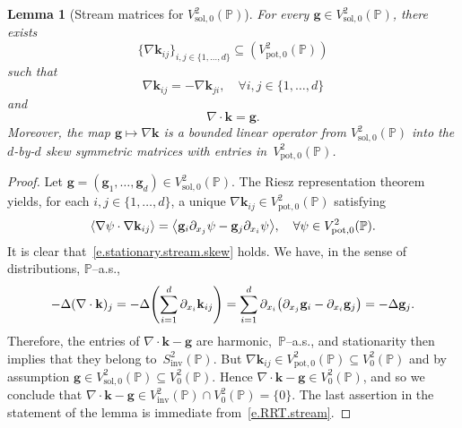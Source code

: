 \documentclass[11pt]{article} %
\numberwithin{equation}{section}
\newtheorem{lemma}[theorem]{Lemma}
\theoremstyle{definition}
\let\originalleft\left
\let\originalright\right
\renewcommand{\left}{\mathopen{}\mathclose\bgroup\originalleft}
\renewcommand{\right}{\aftergroup\egroup\originalright}
\newcommand{\g}{\mathbf{g}}
\newcommand{\pot}{\mathrm{pot}}
\newcommand{\sol}{\mathrm{sol}}
\newcommand{\inv}{\mathrm{inv}}
\renewcommand{\P}{\mathbb{P}}
\begin{document}
\begin{lemma}[Stream matrices for $V^2_{\sol,0}(\P)$]
\label{l.stationary.stream}
For every $\g\in V^2_{\sol,0}(\P)$, there exists
$$\{ \nabla \mathbf{k}_{ij} \}_{i,j\in\{1,\ldots,d\}} \subseteq (V^2_{\pot,0}(\P))$$
such that
\begin{equation}
\label{e.stationary.stream.skew}
\nabla \mathbf{k}_{ij} = -\nabla \mathbf{k}_{ji}, \quad \forall i,j\in\{1,\ldots,d\}
\end{equation}
and 
\begin{equation}
\label{e.divkg}
\nabla \cdot \mathbf{k} = \g. 
\end{equation}
Moreover, the map $\g \mapsto \nabla \mathbf{k}$ is a bounded linear operator from $V^2_{\sol,0}(\P)$ into the $d$-by-$d$ skew symmetric matrices with entries in~$V^2_{\pot,0}(\P)$.  
\end{lemma}
\begin{proof}
Let $\g = (\g_1,\ldots,\g_d) \in V^2_{\sol,0}(\P)$. The Riesz representation theorem yields, for each $i,j\in\{1,\ldots,d\}$, a unique $\nabla \mathbf{k}_{ij}\in V^2_{\pot,0}(\P)$ satisfying
\begin{equation}
\label{e.RRT.stream}
\left\langle \nabla \psi\cdot \nabla \mathbf{k}_{ij}  \right\rangle 
=
\left\langle 
\g_{i} \partial_{x_j} \psi - \g_j \partial_{x_i} \psi
\right\rangle, \quad \forall \psi\in V^2_{\pot,0}(\P).
\end{equation}
It is clear that~\eqref{e.stationary.stream.skew} holds. We have, in the sense of distributions, $\P$--a.s.,  
\begin{equation*}
-\Delta ( \nabla \cdot \mathbf{k} )_j 
= 
-\Delta\left(\sum_{i=1}^d \partial_{x_i} \mathbf{k}_{ij} \right)
=
\sum_{i=1}^d\partial_{x_i} \left( \partial_{x_j} \g_i - \partial_{x_i} \g_j \right)
=
-\Delta \g_j.
\end{equation*}
Therefore, the entries of $\nabla \cdot \mathbf{k} - \g$ are harmonic,~$\P$--a.s., and stationarity then implies that they belong to~$S^2_{\inv}(\P)$. But $\nabla \mathbf{k}_{ij} \in V^2_{\pot,0}(\P) \subseteq V^2_0(\P)$ and by assumption $\g \in V^2_{\sol,0}(\P) \subseteq V^2_0(\P)$. Hence $\nabla \cdot \mathbf{k} - \g \in V^2_{0}(\P)$, and so we conclude that $\nabla \cdot \mathbf{k} - \g \in V^2_{\inv}(\P) \cap V^2_{0}(\P) = \{ 0 \}$. The last assertion in the statement of the lemma is immediate from~\eqref{e.RRT.stream}. 
\end{proof}
\end{document}
